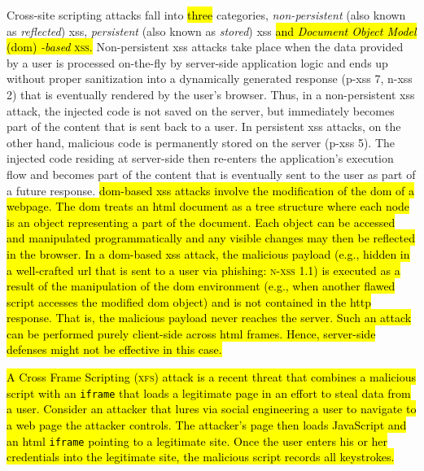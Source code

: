 \documentclass[10pt,journal,compsoc]{IEEEtran}
\newcommand{\hlc}[2][yellow]{ {\sethlcolor{#1} \hl{#2}} }
\begin{document}
Cross-site scripting
attacks fall into \hlc[yellow]{three} categories,
{\it non-persistent}
(also known as \emph{reflected}) {\sc xss},
{\it persistent} (also known as \emph{stored}) {\sc xss}
\hlc[yellow]{and \textit{Document Object Model} ({\sc dom})
\textit{-based} \textsc{xss}.}
Non-persistent {\sc xss} attacks take place when the
data provided by a user is processed on-the-fly
by server-side application logic and ends up without proper sanitization
into a dynamically generated response ({\sc p-xss} 7, {\sc n-xss} 2)
that is eventually rendered by the user's browser.
Thus, in a non-persistent {\sc xss} attack, the injected code
is not saved on the server, but immediately becomes part of the
content that is sent back to a user.
In persistent {\sc xss} attacks, on the other hand,
malicious code is permanently stored on the server ({\sc p-xss} 5).
The injected code residing at server-side then re-enters the
application's execution flow and becomes part of the content that is
eventually sent to the user as part of a future response.
\hlc[yellow]{{\sc dom}-based {\sc xss} attacks involve
the modification of the {\sc dom} of a webpage.
The {\sc dom} treats an {\sc html} document
as a tree structure where each node is an
object representing a part of the document.
Each object can be accessed and manipulated
programmatically and any visible changes
may then be reflected in the browser.
In a {\sc dom}-based {\sc xss} attack,
the malicious payload
(e.g., hidden in a well-crafted {\sc url}
that is sent to a user via phishing:
\textsc{n-xss} 1.1)
is executed as a result of
the manipulation of the {\sc dom}
environment
(e.g., when another flawed script accesses the
modified {\sc dom} object)
and is not contained in
the {\sc http} response.
That is,
the malicious payload never reaches the server.
Such an attack can be performed
purely client-side across {\sc html} frames.
Hence,
server-side defenses might not be effective
in this case.}

\hlc[yellow]{A Cross Frame Scripting (\textsc{xfs})
attack is a recent threat that combines
a malicious script with
an {\tt iframe} that loads a legitimate page in
an effort to steal data from a user.
Consider an attacker that lures via social engineering
a user to navigate to a web page the attacker controls.
The attacker's page then loads JavaScript
and an {\sc html} {\tt iframe} pointing to a legitimate site.
Once the user enters his or her
credentials into the legitimate site,
the malicious script records all keystrokes.}
\end{document}
